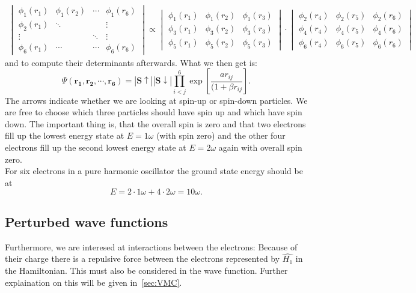 \begin{align}
\begin{vmatrix}
\phi_1(r_1) & \phi_1(r_2) & \cdots & \phi_1(r_6)\\
\phi_2(r_1) & \ddots & &\vdots \\
\vdots & & \ddots& \vdots\\
\phi_6(r_1) & \cdots & \cdots & \phi_6(r_6)
\end{vmatrix}
\propto
\begin{vmatrix}
\phi_1(r_1)& \phi_1(r_2)& \phi_1(r_3)\\
\phi_3(r_1)& \phi_3(r_2)& \phi_3(r_3)\\
\phi_5(r_1)& \phi_5(r_2)& \phi_5(r_3)
\end{vmatrix}
\cdot
\begin{vmatrix}
\phi_2(r_4)& \phi_2(r_5)& \phi_2(r_6)\\
\phi_4(r_4)& \phi_4(r_5)& \phi_4(r_6)\\
\phi_6(r_4)& \phi_6(r_5)& \phi_6(r_6)
\end{vmatrix}
\end{align} 
and to compute their determinants afterwards. What we then get is:
\begin{equation}
\Psi(\mathbf{r_1,r_2,\cdots, r_6})= |\mathbf{S\uparrow}||\mathbf{S\downarrow}|\prod_{i<j}^6 \exp\left[\frac{a r_{ij}}{(1+\beta r_{ij}}\right].
\end{equation}
The arrows indicate whether we are looking at spin-up or spin-down particles. We are free to choose which three particles should have spin up and which have spin down. The important thing is, that the overall spin is zero and that two electrons fill up the lowest energy state at $E=1\omega$ (with spin zero) and the other four electrons fill up the second lowest energy state at $E=2\omega$ again with overall spin zero.\\
For six electrons in a pure harmonic oscillator the ground state energy should be at
\begin{equation}
E = 2 \cdot 1\omega + 4 \cdot 2\omega = 10\omega.
\end{equation}
\subsection{Perturbed wave functions}
Furthermore, we are interesed at interactions between the electrons: Because of their charge there is a repulsive force between the electrons represented by $\hat{H_1}$ in the Hamiltonian. This must also be considered in the wave function. Further explaination on this will be given in~\ref{sec:VMC}.